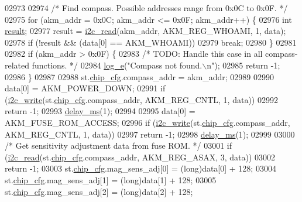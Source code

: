 \begin{DoxyCode}
{{{{{{{{{{{{{{{{{{{{{{{{{{{{{{{{{{02973 
02974     \textcolor{comment}{/* Find compass. Possible addresses range from 0x0C to 0x0F. */}
02975     \textcolor{keywordflow}{for} (akm\_addr = 0x0C; akm\_addr <= 0x0F; akm\_addr++) \{
02976         \textcolor{keywordtype}{int} \hyperlink{sensor_8h_a4c9d9cb8bb9d2b707a152051408f40e5}{result};
02977         result = \hyperlink{_i2_c_8c_ac2d47e7a6c76f93f9b537c31a2986e7b}{i2c\_read}(akm\_addr, AKM\_REG\_WHOAMI, 1, data);
02978         \textcolor{keywordflow}{if} (!result && (data[0] == AKM\_WHOAMI))
02979             \textcolor{keywordflow}{break};
02980     \}
02981 
02982     \textcolor{keywordflow}{if} (akm\_addr > 0x0F) \{
02983         \textcolor{comment}{/* TODO: Handle this case in all compass-related functions. */}
02984         \hyperlink{group___d_r_i_v_e_r_s_gac9308c888b394d1b403d9ba6e1f13fd2}{log\_e}(\textcolor{stringliteral}{"Compass not found.\(\backslash\)n"});
02985         \textcolor{keywordflow}{return} -1;
02986     \}
02987 
02988     st.\hyperlink{structgyro__state__s_ac895217592e2084bd520b0be8e9d20ee}{chip\_cfg}.compass\_addr = akm\_addr;
02989 
02990     data[0] = AKM\_POWER\_DOWN;
02991     \textcolor{keywordflow}{if} (\hyperlink{_i2_c_8c_ac0f145afe8d662af199043939f4398d6}{i2c\_write}(st.\hyperlink{structgyro__state__s_ac895217592e2084bd520b0be8e9d20ee}{chip\_cfg}.compass\_addr, AKM\_REG\_CNTL, 1, data))
02992         \textcolor{keywordflow}{return} -1;
02993     \hyperlink{inv__mpu_8c_ae36aca5baf9b6b7d74992aef00686d67}{delay\_ms}(1);
02994 
02995     data[0] = AKM\_FUSE\_ROM\_ACCESS;
02996     \textcolor{keywordflow}{if} (\hyperlink{_i2_c_8c_ac0f145afe8d662af199043939f4398d6}{i2c\_write}(st.\hyperlink{structgyro__state__s_ac895217592e2084bd520b0be8e9d20ee}{chip\_cfg}.compass\_addr, AKM\_REG\_CNTL, 1, data))
02997         \textcolor{keywordflow}{return} -1;
02998     \hyperlink{inv__mpu_8c_ae36aca5baf9b6b7d74992aef00686d67}{delay\_ms}(1);
02999 
03000     \textcolor{comment}{/* Get sensitivity adjustment data from fuse ROM. */}
03001     \textcolor{keywordflow}{if} (\hyperlink{_i2_c_8c_ac2d47e7a6c76f93f9b537c31a2986e7b}{i2c\_read}(st.\hyperlink{structgyro__state__s_ac895217592e2084bd520b0be8e9d20ee}{chip\_cfg}.compass\_addr, AKM\_REG\_ASAX, 3, data))
03002         \textcolor{keywordflow}{return} -1;
03003     st.\hyperlink{structgyro__state__s_ac895217592e2084bd520b0be8e9d20ee}{chip\_cfg}.mag\_sens\_adj[0] = (long)data[0] + 128;
03004     st.\hyperlink{structgyro__state__s_ac895217592e2084bd520b0be8e9d20ee}{chip\_cfg}.mag\_sens\_adj[1] = (long)data[1] + 128;
03005     st.\hyperlink{structgyro__state__s_ac895217592e2084bd520b0be8e9d20ee}{chip\_cfg}.mag\_sens\_adj[2] = (long)data[2] + 128;
}}}}}}}}}}}}}}}}}}}}}}}}}}}}}}}}}}
\end{DoxyCode}
